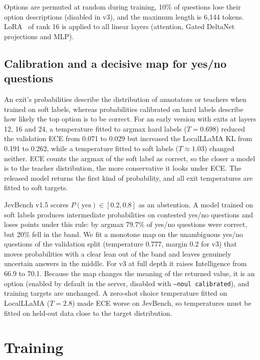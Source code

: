 \documentclass[10pt]{article}
\begin{document}
Options are permuted at random during training, 10\% of questions lose their option descriptions (disabled in v3), and the maximum length is 6,144 tokens.
LoRA~\cite{lora} of rank 16 is applied to all linear layers (attention, Gated DeltaNet projections and MLP).

\subsection{Calibration and a decisive map for yes/no questions}
\label{sec:calib}

An exit's probabilities describe the distribution of annotators or teachers when trained on soft labels, whereas probabilities calibrated on hard labels describe how likely the top option is to be correct.
For an early version with exits at layers 12, 16 and 24, a temperature fitted to argmax hard labels ($T=0.698$) reduced the validation ECE from 0.071 to 0.029 but increased the LocalLLaMA KL from 0.191 to 0.262, while a temperature fitted to soft labels ($T\approx 1.03$) changed neither.
ECE counts the argmax of the soft label as correct, so the closer a model is to the teacher distribution, the more conservative it looks under ECE.
The released model returns the first kind of probability, and all exit temperatures are fitted to soft targets.

JevBench v1.5 scores $P(\text{yes})\in[0.2,0.8]$ as an abstention.
A model trained on soft labels produces intermediate probabilities on contested yes/no questions and loses points under this rule: by argmax 79.7\% of yes/no questions were correct, but 20\% fell in the band.
We fit a monotone map on the unambiguous yes/no questions of the validation split (temperature 0.777, margin 0.2 for v3) that moves probabilities with a clear lean out of the band and leaves genuinely uncertain answers in the middle.
For v3 at full depth it raises Intelligence from 66.9 to 70.1.
Because the map changes the meaning of the returned value, it is an option (enabled by default in the server, disabled with \texttt{--noul calibrated}), and training targets are unchanged.
A zero-shot choice temperature fitted on LocalLLaMA ($T=2.8$) made ECE worse on JevBench, so temperatures must be fitted on held-out data close to the target distribution.

\section{Training}
\label{sec:training}
\end{document}
